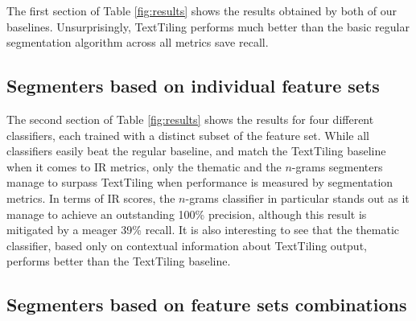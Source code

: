 The first section of Table \ref{fig:results} shows the results obtained by both of our baselines. Unsurprisingly, TextTiling performs much better than the basic regular segmentation algorithm across all metrics save recall.

\subsection{Segmenters based on individual feature sets}


The second section of Table \ref{fig:results} shows the results for four different classifiers, each trained with a distinct subset of the feature set. While all classifiers easily beat the regular baseline, and match the TextTiling baseline when it comes to IR metrics, only the thematic and the $n$-grams segmenters manage to surpass TextTiling when performance is measured by segmentation metrics. In terms of IR scores, the $n$-grams classifier in particular stands out as it manage to achieve an outstanding 100\% precision, although this result is mitigated by a meager 39\% recall. It is also interesting to see that the thematic classifier, based only on contextual information about TextTiling output, performs better than the TextTiling baseline.


\subsection{Segmenters based on feature sets combinations}

